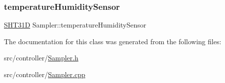 \subsubsection{\texorpdfstring{temperature\+Humidity\+Sensor}{temperatureHumiditySensor}}
{\footnotesize\ttfamily \hyperlink{classSHT31D}{S\+H\+T31D} Sampler\+::temperature\+Humidity\+Sensor\hspace{0.3cm}{\ttfamily [private]}}



The documentation for this class was generated from the following files\+:\begin{DoxyCompactItemize}
\item 
src/controller/\hyperlink{Sampler_8h}{Sampler.\+h}\item 
src/controller/\hyperlink{Sampler_8cpp}{Sampler.\+cpp}\end{DoxyCompactItemize}
